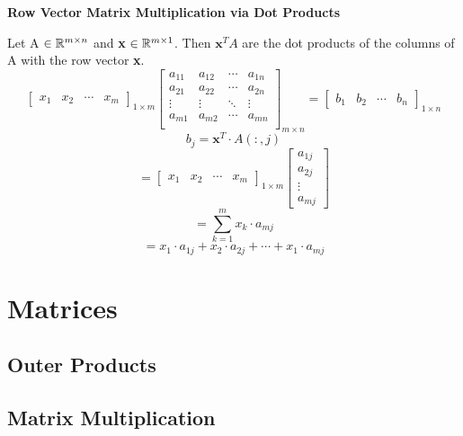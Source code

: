 \documentclass[12pt]{article}
\begin{document}
\begin{defin}{\textbf{Row Vector Matrix Multiplication via Dot Products}}

    Let A $\in \mathbb{R}^{m \times n}$ and \textbf{x} $\in \mathbb{R}^{m \times 1}$. Then $\textbf{x}^T A$ are the dot products of the columns of A with the row vector \textbf{x}. 
    \[
    \begin{bmatrix}
        x_1 & x_2 & \cdots & x_m
    \end{bmatrix}_{1 \times m}
    \begin{bmatrix}
        a_{11} & a_{12} & \cdots & a_{1n} \\
        a_{21} & a_{22} & \cdots & a_{2n} \\
        \vdots & \vdots & \ddots & \vdots \\
        a_{m1} & a_{m2} & \cdots & a_{mn} \\
    \end{bmatrix}_{m \times n}
    =
    \begin{bmatrix}
        b_1 & b_2 & \cdots & b_n
    \end{bmatrix}_{1 \times n}
    \]
    \[
    b_j = \textbf{x}^T \cdot A(:, j)
    \]
    \[
    =
    \begin{bmatrix}
        x_1 & x_2 & \cdots & x_m
    \end{bmatrix}_{1 \times m}
    \begin{bmatrix}
        a_{1j} \\ a_{2j} \\ \vdots \\ a_{mj}
    \end{bmatrix}
    \]
    \[= \sum_{k=1}^{m}x_k \cdot a_{mj}\]
    \[= x_1 \cdot a_{1j} + x_2 \cdot a_{2j} + \cdots + x_1 \cdot a_{mj}\]
    
\end{defin}


\newpage
\section{Matrices}
\subsection{Outer Products}
\subsection{Matrix Multiplication}
\end{document}
